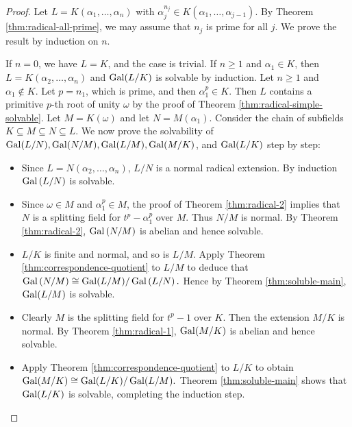 \begin{proof}
	Let $L=K\left(\alpha_1, \ldots, \alpha_n\right)$ with $\alpha_j^{n_j} \in K\left(\alpha_1, \ldots, \alpha_{j-1}\right)$. By Theorem \ref{thm:radical-all-prime}, we may assume that $n_j$ is prime for all $j$. We prove the result by induction on $n$. 
	
	If $n = 0$, we have $L = K$, and the case is trivial.
	If $n \ge 1$ and $\alpha_1 \in K$, then $L=K\left(\alpha_2, \ldots, \alpha_n\right)$ and $\operatorname{Gal}(L / K)$ is solvable by induction.
	Let $n \ge 1$ and $\alpha_1 \notin K$. Let $p = n_1$, which is prime, and then $\alpha_1^p \in K$.  Then $L$ contains a primitive $p$-th root of unity $\omega$ by the proof of Theorem \ref{thm:radical-simple-solvable}. Let $M = K(\omega)$ and let $N = M(\alpha_1)$. Consider the chain of subfields $K \subseteq M \subseteq N \subseteq L$. We now prove the solvability of $\operatorname{Gal}(L/N), \operatorname{Gal}(N/M), \operatorname{Gal}(L/M), \operatorname{Gal}(M/K)$, and $\operatorname{Gal}(L/K)$ step by step:
	
	\begin{itemize}
		\item Since $L=N\left(\alpha_2, \ldots, \alpha_n\right)$, $L / N$ is a normal radical extension. By induction $\operatorname{Gal}\left(L / N\right)$ is solvable. 
		\item Since $ \omega \in M$ and $\alpha_1^p \in M$, the proof of Theorem \ref{thm:radical-2} implies that $N$ is a splitting field for $t^p-\alpha_1^p$ over $M$. Thus $N / M$ is normal. By Theorem \ref{thm:radical-2}, $\operatorname{Gal}\left(N / M\right)$ is abelian and hence solvable. 
		\item  $L/ K$ is finite and normal, and so is $L / M$. Apply Theorem \ref{thm:correspondence-quotient} to $L / M$ to deduce that
		$
		\operatorname{Gal}\left( N / M \right) \cong \operatorname{Gal}(L / M) / \operatorname{Gal}\left(L / N\right).
		$
		Hence by Theorem \ref{thm:soluble-main},  $ \operatorname{Gal}(L / M)$ is solvable.
		\item Clearly $M$ is the splitting field for $t^p-1$ over $K$. Then the extension $M / K$ is normal. By Theorem \ref{thm:radical-1}, $\operatorname{Gal}(M / K)$ is abelian and hence solvable.
		\item  Apply Theorem \ref{thm:correspondence-quotient} to $L / K$ to obtain
		$
		\operatorname{Gal}(M / K) \cong \operatorname{Gal}(L / K) / \operatorname{Gal}(L / M). 
		$
		Theorem \ref{thm:soluble-main} shows that $\operatorname{Gal}(L / K)$ is solvable, completing the induction step.
	\end{itemize}
\end{proof}


